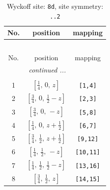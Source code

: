 \documentclass[fleqn,8pt]{jsarticle}
\begin{document}
\begin{longtable}{ccc}
\caption{Wyckoff site: {\tt 8d}, site symmetry: {\tt ..2}}
 \\
 \hline \hline
No. & position & mapping \\ \hline \endfirsthead

\multicolumn{2}{l}{\tablename\ \thetable{}} \\
 \hline \hline
No. & position & mapping \\ \hline \endhead

 \hline \hline
\multicolumn{2}{r}{\footnotesize\it continued ...} \\ \endfoot

 \hline \hline
\multicolumn{2}{r}{} \\ \endlastfoot

1 & $\left[ \frac{1}{4},\, 0,\, z \right]$ & {\tt [1,4]} \\ \hline
2 & $\left[ \frac{3}{4},\, 0,\, \frac{1}{2} - z \right]$ & {\tt [2,3]} \\ \hline
3 & $\left[ \frac{3}{4},\, 0,\, - z \right]$ & {\tt [5,8]} \\ \hline
4 & $\left[ \frac{1}{4},\, 0,\, z + \frac{1}{2} \right]$ & {\tt [6,7]} \\ \hline
5 & $\left[ \frac{3}{4},\, \frac{1}{2},\, z + \frac{1}{2} \right]$ & {\tt [9,12]} \\ \hline
6 & $\left[ \frac{1}{4},\, \frac{1}{2},\, - z \right]$ & {\tt [10,11]} \\ \hline
7 & $\left[ \frac{1}{4},\, \frac{1}{2},\, \frac{1}{2} - z \right]$ & {\tt [13,16]} \\ \hline
8 & $\left[ \frac{3}{4},\, \frac{1}{2},\, z \right]$ & {\tt [14,15]} \\
\end{longtable}
\renewcommand{\arraystretch}{1.2}
\end{document}
